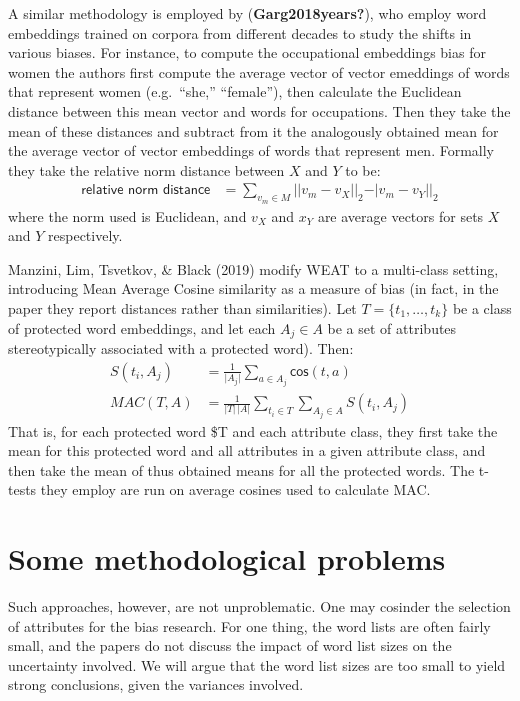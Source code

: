 \documentclass[
  10pt,
  dvipsnames,enabledeprecatedfontcommands]{scrartcl}
\begin{document}
A similar methodology is employed by (\textbf{Garg2018years?}), who
employ word embeddings trained on corpora from different decades to
study the shifts in various biases. For instance, to compute the
occupational embeddings bias for women the authors first compute the
average vector of vector emeddings of words that represent women
(e.g.~``she,'' ``female''), then calculate the Euclidean distance
between this mean vector and words for occupations. Then they take the
mean of these distances and subtract from it the analogously obtained
mean for the average vector of vector embeddings of words that represent
men. Formally they take the relative norm distance between \(X\) and
\(Y\) to be: \begin{align}
\textsf{relative norm distance} & = \sum_{v_m\in M} \vert \vert v_m - v_X\vert \vert_2 - \vert v_m - v_Y\vert \vert_2
\end{align} \noindent where the norm used is Euclidean, and \(v_X\) and
\(x_Y\) are average vectors for sets \(X\) and \(Y\) respectively.

Manzini, Lim, Tsvetkov, \& Black (2019) modify WEAT to a multi-class
setting, introducing Mean Average Cosine similarity as a measure of bias
(in fact, in the paper they report distances rather than similarities).
Let \(T = \{t_1, \dots, t_k\}\) be a class of protected word embeddings,
and let each \(A_j\in A\) be a set of attributes stereotypically
associated with a protected word). Then: \begin{align}
S(t_i, A_j) & = \frac{1}{\vert A_j\vert}\sum_{a\in A_j}\mathsf{cos}(t,a) \\
MAC(T,A) & = \frac{1}{\vert T \vert \,\vert A\vert}\sum_{t_i \in T }\sum_{A_j \in A} S(t_i,A_j)
\end{align} That is, for each protected word \$T and each attribute
class, they first take the mean for this protected word and all
attributes in a given attribute class, and then take the mean of thus
obtained means for all the protected words. The t-tests they employ are
run on average cosines used to calculate MAC.

\hypertarget{some-methodological-problems}{%
\section{Some methodological
problems}\label{some-methodological-problems}}

Such approaches, however, are not unproblematic. One may cosinder the
selection of attributes for the bias research. For one thing, the word
lists are often fairly small, and the papers do not discuss the impact
of word list sizes on the uncertainty involved. We will argue that the
word list sizes are too small to yield strong conclusions, given the
variances involved.
\end{document}
